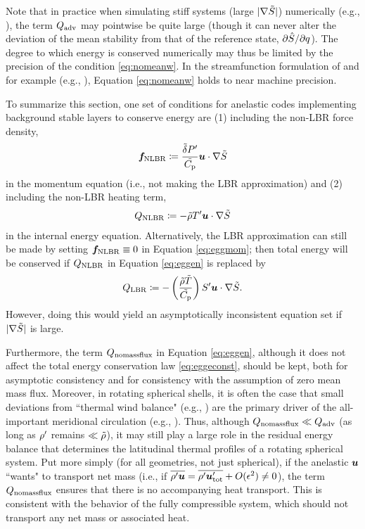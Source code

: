 \documentclass[12pt]{article}
\newcommand{\heatlbr}{Q_{\rm LBR}}
\newcommand{\heatnlbr}{Q_{\rm NLBR}}
\newcommand{\forcenlbr}{\bm{f}_{\rm NLBR}}
\newcommand{\heatnomassflux}{Q_{\rm nomassflux}}
\newcommand{\heatadv}{Q_{\rm adv}}
\newcommand{\utotprime}{{\vecu}_{\rm tot}^\prime}
\begin{document}
Note that in practice when simulating stiff systems (large $|\nabla\tilde{S}|$) numerically (e.g., \citealt{Guerrero2016a,Matilsky2022,Korre2024,Matilsky2024}), the term $\heatadv$ may pointwise be quite large (though it can never alter the deviation of the mean stability from that of the reference state, $\partial\hat{S}/\partial q$). The degree to which energy is conserved numerically may thus be limited by the precision of the condition \eqref{eq:nomeanw}. In the streamfunction formulation of {\ash} and {\rayleigh} for example (e.g., \citealt{Clune1999,Featherstone2016a}), Equation \eqref{eq:nomeanw} holds to near machine precision. 

To summarize this section, one set of conditions for anelastic codes implementing background stable layers to conserve energy are (1) including the non-LBR force density,
\begin{align}\label{eq:nlbrmomref}
	\forcenlbr \define\frac{\deltatilde  \prsprime}{\cptilde} \vecu\cdot \nabla\entrtilde 
\end{align}
in the momentum equation (i.e., not making the LBR approximation) and (2) including the non-LBR heating term,
\begin{align}\label{eq:nlbrheatref}
	\heatnlbr \define -  \rhotilde\tmpprime \ugrad\entrtilde
\end{align}
in the internal energy equation. Alternatively, the LBR approximation can still be made by setting $\forcenlbr\equiv0$ in Equation \eqref{eq:eggmom}; then total energy will be conserved if $\heatnlbr$ in Equation \eqref{eq:eggen} is replaced by
\begin{align}\label{eq:lbrheating}
	\heatlbr\define - \left(\frac{\rhotilde\tmptilde}{\cptilde} \right) \entrprime\ugrad\entrtilde.
\end{align}
However, doing this would yield an asymptotically inconsistent equation set if $|\nabla\tilde{S}|$ is large. 

Furthermore, the term $\heatnomassflux$ in Equation \eqref{eq:eggen}, although it does not affect the total energy conservation law \eqref{eq:eggeconst}, should be kept, both for asymptotic consistency and for consistency with the assumption of zero mean mass flux. Moreover, in rotating spherical shells, it is often the case that small deviations from ``thermal wind balance" (e.g., \citealt{Rempel2005,Vallis2017,Matilsky2023}) are the primary driver of the all-important meridional circulation (e.g., \citealt{Choudhuri2020}). Thus, although $\heatnomassflux\ll\heatadv$ (as long as ${\rho^\prime}$ remains $\ll\tilde{\rho}$), it may still play a large role in the residual energy balance that determines the latitudinal thermal profiles of a rotating spherical system. Put more simply (for all geometries, not just spherical), if the anelastic $\bm{u}$ ``wants" to transport net mass (i.e., if $\overline{\rhoprime\vecu}=\overline{\rhoprime\utotprime} + O(\epsilon^2) \neq0$), the term $\heatnomassflux$ ensures that there is no accompanying heat transport. This is consistent with the behavior of the fully compressible system, which should not transport any net mass or associated heat.
\end{document}
